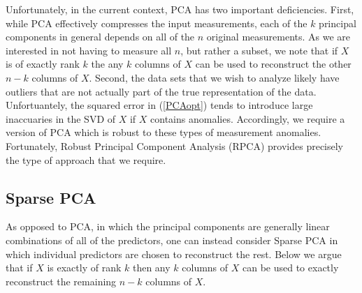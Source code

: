 \documentclass[conference]{IEEEtran}
\begin{document}

Unfortunately, in the current context, PCA has two important deficiencies.  First, while PCA effectively compresses the input measurements, each of the $k$ principal components in general depends on all of the $n$ original measurements.   As we are interested in not having to measure all $n$, but rather a subset, we note that if $X$ is of exactly rank $k$ the any $k$ columns of $X$ can be used to reconstruct the other $n-k$ columns of $X$.
Second, the data sets that we wish to analyze likely have outliers that are not actually part of the true representation of the data.  Unfortuantely, the squared error in (\ref{PCAopt}) tends to introduce large inaccuaries in the SVD of $X$ if $X$ contains anomalies.
Accordingly, we require a version of PCA which is robust to these types of measurement anomalies.   Fortunately, Robust Principal Component Analysis (RPCA) \cite{Candes2009,
 Candes2011, Chandrasekaran2009, Cai2010, Paffenroth2012a,Paffenroth2013b} provides precisely the type of approach that we require.   

\subsection{Sparse PCA}\label{SPCA}

As opposed to PCA, in which the principal components are generally linear combinations of all of the predictors, one can instead consider Sparse PCA \cite{htf01} in which individual predictors are chosen to reconstruct the rest. Below we argue that  if $X$ is exactly of rank $k$ then any $k$ columns of $X$ can be used to exactly reconstruct the remaining $n-k$ columns of $X$.
\end{document}
